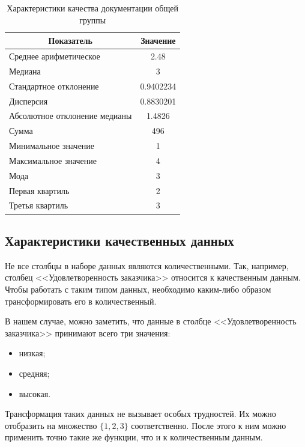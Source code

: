 \begin{table}[H]
	\centering
	\caption{Характеристики качества документации общей группы}
	\begin{tabular}{|l|c|}
		\hline
		\multicolumn{1}{|c|}{\textbf{Показатель}} & \textbf{Значение}\\ \hline
		Среднее арифметическое        & 2.48      \\ \hline
		Медиана                       & 3         \\ \hline
		Стандартное отклонение        & 0.9402234 \\ \hline
		Дисперсия                      & 0.8830201 \\ \hline
		Абсолютное отклонение медианы & 1.4826    \\ \hline
		Сумма                         & 496       \\ \hline
		Минимальное значение          & 1         \\ \hline
		Максимальное значение         & 4         \\ \hline
		Мода & 3 \\ \hline
		Первая квартиль & 2 \\ \hline
		Третья квартиль & 3 \\ \hline
	\end{tabular}
\end{table}


\subsection{Характеристики качественных данных}
Не все столбцы в наборе данных являются количественными. Так, например, столбец <<Удовлетворенность заказчика>> относится к качественным данным. Чтобы работать с таким типом данных, необходимо каким-либо образом трансформировать его в количественный.

В нашем случае, можно заметить, что данные в столбце <<Удовлетворенность заказчика>> принимают всего три значения:
\begin{itemize}
	\item низкая;
	\item средняя;
	\item высокая.
\end{itemize}

Трансформация таких данных не вызывает особых трудностей. Их можно отобразить на множество $\{1, 2, 3\}$ соответственно. После этого к ним можно применить точно такие же функции, что и к количественным данным.

